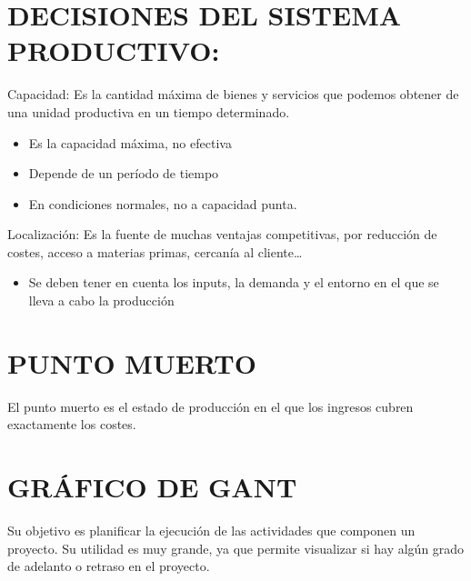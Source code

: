 \documentclass[12pt, twoside, openright]{report} %
\begin{document}
\section{DECISIONES DEL SISTEMA PRODUCTIVO:}

Capacidad: Es la cantidad máxima de bienes y servicios que podemos obtener de una unidad productiva en un tiempo determinado.
\begin{itemize}
	\item Es la capacidad máxima, no efectiva
	\item Depende de un período de tiempo
	\item En condiciones normales, no a capacidad punta.
\end{itemize}
Localización: Es la fuente de muchas ventajas competitivas, por reducción de costes, acceso a materias primas, cercanía al cliente…
\begin{itemize}
	\item Se deben tener en cuenta los inputs, la demanda y el entorno en el que se lleva a cabo la producción
\end{itemize}

\section{PUNTO MUERTO}

El punto muerto es el estado de producción en el que los ingresos cubren exactamente los costes.

\section{GRÁFICO DE GANT}
Su objetivo es planificar la ejecución de las actividades que componen un proyecto. Su utilidad es muy grande, ya que permite visualizar si hay algún grado de adelanto o retraso en el proyecto.
\end{document}
